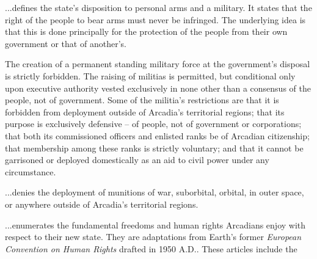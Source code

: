 \item %

...defines the state's disposition to personal arms and a military. It states that the right of the people to bear arms must never be infringed. The underlying idea is that this is done principally for the protection of the people from their own government or that of another's.

The creation of a permanent standing military force at the government's disposal is strictly forbidden. The raising of militias is permitted, but conditional only upon executive authority vested exclusively in none other than a consensus of the people, not of government. Some of the militia's restrictions are that it is forbidden from deployment outside of Arcadia's territorial regions; that its purpose is exclusively defensive -- of people, not of government or corporations; that both its commissioned officers and enlisted ranks be of Arcadian citizenship; that membership among these ranks is strictly voluntary; and that it cannot be garrisoned or deployed domestically as an aid to civil power under any circumstance.

\item %

...denies the deployment of munitions of war, suborbital, orbital, in outer space, or anywhere outside of Arcadia's territorial regions.
\stoparticle

\startarticle[start=11]
\item %

...enumerates the fundamental freedoms and human rights Arcadians enjoy with respect to their new state. They are adaptations from Earth's former {\it European Convention on Human Rights} drafted in 1950 A.D.. These articles include the

